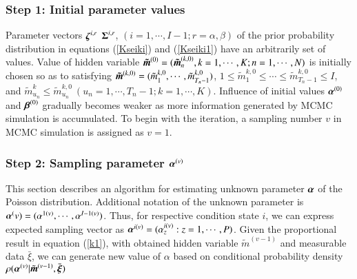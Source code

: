 \documentclass[a4paper,oneside,onecolumn,preprint,10pt,authoryear]{elsarticle}
\begin{document}
\subsubsection{Step 1: Initial parameter values} \label{sec551}
Parameter vectors $\mbox{\boldmath$\zeta$}^{i,r}$ $\mbox{\boldmath$\Sigma$}^{i,r}$, $(i=1,\cdots,I-1; r = \alpha,\beta)$ of the prior probability distribution in equations (\ref{Kseiki}) and (\ref{Kseiki1}) have an arbitrarily set of values. Value of hidden variable $\mbox{\boldmath$\tilde{m}$}^{(0)}=(\mbox{\boldmath$\tilde{m}$}_n^{(k,0)},k=1,\cdots,K; n=1,\cdots,N)$ is initially chosen so as to satisfying $\mbox{\boldmath$\tilde{m}$}^{(k,0)}=(\tilde{m}_1^{k,0},\cdots,\tilde{m}_{T_n-1}^{k,0})$, $1\leq \tilde{m}_1^{k,0}\leq \cdots \leq \tilde{m}_{T_n-1}^{k,0}\leq I$, and $\tilde{m}_{u_n}^k\leq \tilde{m}_{u_n}^{k,0}~(u_n=1,\cdots,T_n-1;k=1,\cdots,K)$. Influence of initial values $\mbox{\boldmath$\alpha$}^{(0)}$ and $\mbox{\boldmath$\beta$}^{(0)}$ gradually becomes weaker as more information generated by MCMC simulation is accumulated. To begin with the iteration, a sampling number $v$ in MCMC simulation is assigned as $v=1$.

\subsubsection{Step 2: Sampling parameter $\mbox{\boldmath$\alpha$}^{(v)}$} \label{sec552}
This section describes an algorithm for estimating unknown parameter $\mbox{\boldmath$\alpha$}$ of the Poisson distribution. Additional notation of the unknown parameter is $\mbox{\boldmath$\alpha$}^(v)=(\alpha^{1(v)},\cdots,\alpha^{I-1(v)})$. Thus, for respective condition state $i$, we can express expected sampling vector as $\mbox{\boldmath$\alpha$}^{i(v)}=(\alpha^{i(v)}_z: z=1,\cdots,P)$. Given the proportional result in equation (\ref{k1}), with obtained hidden variable $\tilde{m}^{(v-1)}$ and measurable data $\bar{\xi}$, we can generate new value of $\alpha$ based on conditional probability density $ \rho(\mbox{\boldmath$\alpha$}^{(v)}|\tilde{\mbox{\boldmath$m$}}^{(v-1)},\bar{\mbox{\boldmath$\xi$}})$
\end{document}
